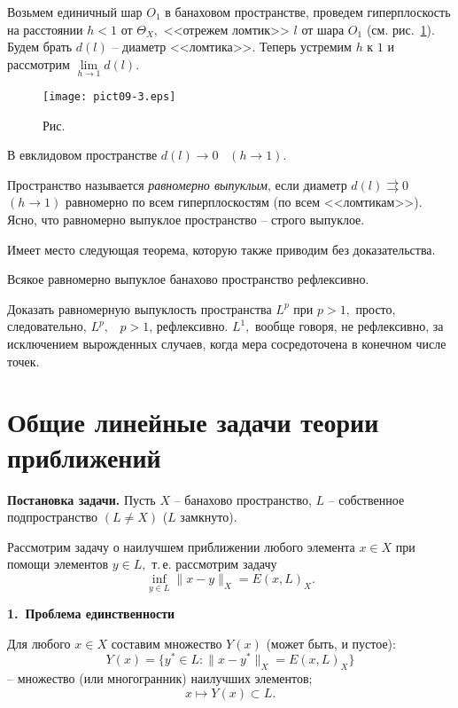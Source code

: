  Возьмем единичный шар $O_1$ в банаховом пространстве, проведем гиперплоскость
  на расстоянии $h<1$ от $\Theta_X,$ <<отрежем ломтик>> $l$ от шара $O_1$ (см. рис.~\ref{r9-3}).
   Будем брать $d(l)$
  -- диаметр <<ломтика>>. Теперь устремим $h$ к $1$ и рассмотрим
 $\lim\limits_{h\to 1} d(l).$

 \bigskip
\begin{figure}[ht]
\begin{center}
\texttt{[image: pict09-3.eps]}
\end{center}
 \bigskip
 \label{r9-3}

 \centerline{Рис.~\theris}
 \bigskip
\end{figure}


\noindent В евклидовом пространстве $d(l)\to 0$~ $(h\to 1).$

 Пространство называется {\it равномерно выпуклым}, если
  диаметр $d(l) \rightrightarrows 0$~ $(h\to 1)$
  равномерно по всем гиперплоскостям {(по всем <<ломтикам>>)}.
  Ясно, что равномерно выпуклое пространство -- строго
  выпуклое.

 {Имеет место} следующая теорема, которую также приводим
 без доказательства.
 \begin{teo}[Кларксон] %
 Всякое равномерно выпуклое банахово пространство рефлексивно.
 \end{teo}

 Доказать равномерную выпуклость пространства ${L^p}$ при $p>1,$
 просто, следовательно, ${L^p},$~ $p>1$,  рефлексивно. ${L^1},$
 вообще говоря, не рефлексивно, за исключением
 вырожденных случаев, когда мера сосредоточена в
 конечном числе точек.

 \section{Общие линейные задачи теории приближений}

 {\bf Постановка задачи.} Пусть $X$ -- банахово пространство,
 $L$ -- собственное подпространство $(L\ne X)$ ($L$ замкнуто).

 Рассмотрим задачу о наилучшем приближении
 любого элемента $x\in X$ при помощи элементов $y\in L,$ т.\,е. рассмотрим
 задачу
 $$
 \inf_{y\in L} \|x-y\|_X=E(x,L)_X.
 $$

 \vspace{3mm}
 {\bf 1.~Проблема единственности}
 \vspace{3mm}

 Для любого $x\in X$ составим множество $Y(x)$
 (может быть, и пустое):
 $$
 Y(x)=\{ y^*\in L : \|x-y^*\|_X=E(x,L)_X\}
 $$
 -- множество (или многогранник) наилучших элементов;
 $$
 x\longmapsto Y(x)\subset L.
 $$

